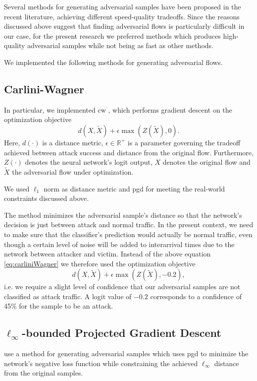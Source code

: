 \documentclass[conference]{IEEEtran}
\begin{document}
Several methods for generating adversarial samples have been proposed in the recent literature, achieving different speed-quality tradeoffs. Since the reasons discussed above suggest that finding adversarial flows is particularly difficult in our case, for the present research we preferred methods which produces high-quality adversarial samples while not being as fast as other methods.

We implemented the following methods for generating adversarial flows.

\subsection{Carlini-Wagner}
In particular, we implemented \gls{cw} \cite{carlini_towards_2017}, which performs gradient descent on the optimization objective
\begin{equation} \label{eq:carliniWagner}
d(X,\tilde X) + \epsilon  \max(Z(\tilde X), 0).
\end{equation}
Here, $d(\cdot)$ is a distance metric, $\epsilon \in \mathbb R^+$ is a parameter governing the tradeoff achieved between attack success and distance from the original flow. Furthermore, $Z(\cdot)$ denotes the neural network's logit output, $X$ denotes the original flow and $\tilde X$ the adversarial flow under optimization.

We used $\ell_1$ norm as distance metric and \gls{pgd} for meeting the real-world constraints discussed above.

The method minimizes the adversarial sample's distance so that the network's decision is just between attack and normal traffic. In the present context, we need to make sure that the classifier's prediction would actually be normal traffic, even though a certain level of noise will be added to interarrival times due to the network between attacker and victim. Instead of the above equation \ref{eq:carliniWagner} we therefore used the optimization objective
\begin{equation}
d(X,\tilde X) + \epsilon  \max(Z(\tilde X), -0.2),
\end{equation}
i.e. we require a slight level of confidence that our adversarial samples are not classified as attack traffic. A logit value of $-0.2$ corresponds to a confidence of 45\% for the sample to be an attack.

\subsection{$\ell_\infty$-bounded Projected Gradient Descent}
\cite{madry_towards_2018} use a method for generating adversarial samples which uses \gls{pgd}  to minimize the network's negative loss function while constraining the achieved $\ell_\infty$ distance from the original samples.
\end{document}
